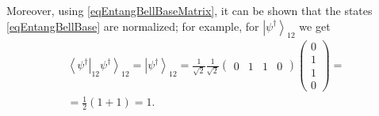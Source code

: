 Moreover, using \eqref{eqEntangBellBaseMatrix}, it can be shown that the states \eqref{eqEntangBellBase} are normalized; for example, for $\left|\psi^{\dag}\right>_{12}$ we get 
\begin{eqnarray}
\left<\psi^{\dag}\right|_{12}\left.\psi^{\dag}\right>_{12} = 
  \left|\psi^{\dag}\right>_{12} = 
  \frac{1}{\sqrt{2}} \frac{1}{\sqrt{2}}
  \left(
  \begin{array}{cccc}
    0 & 1 & 1 & 0
  \end{array}
  \right)   
  \left(
  \begin{array}{c}
    0 \\
    1 \\
    1 \\
    0
  \end{array}
  \right) = 
\nonumber \\
=
  \frac{1}{2}\left(1 + 1\right) = 1.
\nonumber 
\end{eqnarray}